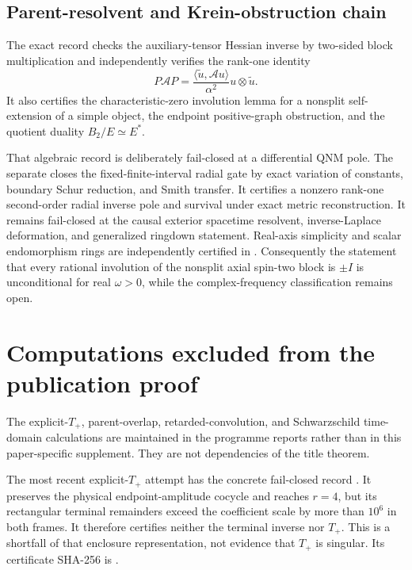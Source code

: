 \documentclass[11pt]{article}
\begin{document}
\subsection{Parent-resolvent and Krein-obstruction chain}

The exact record
checks the auxiliary-tensor Hessian inverse by two-sided block
multiplication and independently verifies the rank-one identity
\[
P\mathcal AP
=\frac{\langle\widetilde u,\mathcal Au\rangle}{\alpha^2}
u\otimes\widetilde u .
\]
It also certifies the characteristic-zero involution lemma for a nonsplit
self-extension of a simple object, the endpoint positive-graph
obstruction, and the quotient duality \(B_2/E\simeq E^*\).

That algebraic record is deliberately fail-closed at a differential QNM pole.
The separate
closes the fixed-finite-interval radial gate by exact variation of constants,
boundary Schur reduction, and Smith transfer.  It certifies a nonzero
rank-one second-order radial inverse pole and survival under exact metric
reconstruction.  It remains fail-closed at the causal exterior spacetime
resolvent, inverse-Laplace deformation, and generalized ringdown statement.
Real-axis simplicity and scalar
endomorphism rings are independently certified in
.  Consequently the
statement that every rational involution of the nonsplit axial spin-two
block is \(\pm I\) is unconditional for real \(\omega>0\), while the
complex-frequency classification remains open.

\section{Computations excluded from the publication proof}

The explicit-\(T_+\), parent-overlap, retarded-convolution, and Schwarzschild
time-domain calculations are maintained in the programme reports rather than
in this paper-specific supplement.  They are not dependencies of the title
theorem.

The most recent explicit-\(T_+\) attempt has the concrete fail-closed record
.
It preserves the physical endpoint-amplitude cocycle and reaches \(r=4\),
but its rectangular terminal remainders exceed the coefficient scale by
more than \(10^6\) in both frames.  It therefore certifies neither the
terminal inverse nor \(T_+\).  This is a shortfall of that enclosure
representation, not evidence that \(T_+\) is singular.  Its certificate
SHA-256 is
.
\end{document}
